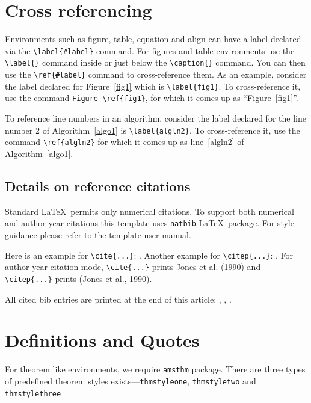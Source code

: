 \lipsum[1-2]

\section{Cross referencing}\label{sec:cross-ref}

Environments such as figure, table, equation and align can have a label
declared via the \verb+\label{#label}+ command. For figures and table
environments use the \verb+\label{}+ command inside or just
below the \verb+\caption{}+ command. You can then use the
\verb+\ref{#label}+ command to cross-reference them. As an example, consider
the label declared for Figure~\ref{fig1} which is
\verb+\label{fig1}+. To cross-reference it, use the command 
\verb+Figure \ref{fig1}+, for which it comes up as
``Figure~\ref{fig1}''. 

To reference line numbers in an algorithm, consider the label declared for the line number 2 of Algorithm~\ref{algo1} is \verb+\label{algln2}+. To cross-reference it, use the command \verb+\ref{algln2}+ for which it comes up as line~\ref{algln2} of Algorithm~\ref{algo1}.

\subsection{Details on reference citations}\label{subsec7}

Standard \LaTeX\ permits only numerical citations. To support both numerical and author-year citations this template uses \verb+natbib+ \LaTeX\ package. For style guidance please refer to the template user manual.

Here is an example for \verb+\cite{...}+: \cite{buschmann1998}. Another example for \verb+\citep{...}+: \citep{cardoso2015fundamentals}. For author-year citation mode, \verb+\cite{...}+ prints Jones et al. (1990) and \verb+\citep{...}+ prints (Jones et al., 1990).

All cited bib entries are printed at the end of this article: \cite{Twitter2016}, \cite{cardoso2015fundamentals}, \cite{buschmann1998}.

\section{Definitions and Quotes}\label{sec:def}

For theorem like environments, we require \verb+amsthm+ package. There are three types of predefined theorem styles exists---\verb+thmstyleone+, \verb+thmstyletwo+ and \verb+thmstylethree+ 

